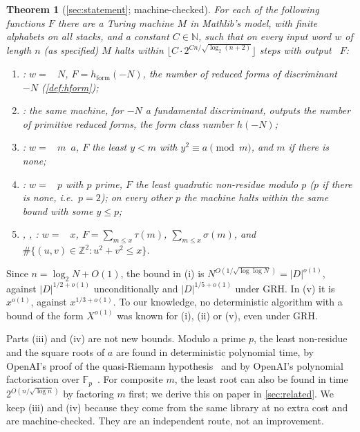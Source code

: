 \documentclass[10pt]{amsart}
\theoremstyle{plain}
\newtheorem{theorem}{Theorem}[section]
\theoremstyle{definition}
\theoremstyle{remark}
\numberwithin{equation}{section}
\newcommand{\Z}{\mathbb{Z}}
\newcommand{\N}{\mathbb{N}}
\newcommand{\hF}{h_{\mathrm{form}}}
\newcommand{\rate}{2^{O(n/\sqrt{\log n})}}
\begin{document}
\begin{theorem}[\cref{sec:statement}; machine-checked]\label{thm:main}
For each of the following functions $F$ there are a Turing machine $M$ in Mathlib's  model,
with finite alphabets on all stacks, and a constant $C\in\N$, such that on every input word $w$ of
length $n$ (as specified) $M$ halts within $\lfloor C\cdot2^{Cn/\sqrt{\log_2(n+2)}}\rfloor$ steps with
output ~$F$:
\begin{enumerate}[label=(\roman*)]
\item {}: $w=$ ~$N$, $F=\hF(-N)$, the number of reduced forms of
discriminant $-N$ (\cref{def:hform});
\item {}: the same machine, for $-N$ a fundamental discriminant, outputs the number of
primitive reduced forms, the form class number $h(-N)$;
\item {}: $w=$ ~$m$~$a$, $F$ the least $y<m$ with $y^2\equiv a\pmod m$,
and $m$ if there is none;
\item {}: $w=$ ~$p$ with $p$ prime, $F$ the least quadratic non-residue
modulo $p$ ($p$ if there is none, i.e.\ $p=2$); on every other $p$ the machine halts within the
same bound with some $y\le p$;
\item {}, , : $w=$ ~$x$,
$F=\sum_{m\le x}\tau(m)$, $\sum_{m\le x}\sigma(m)$, and $\#\{(u,v)\in\Z^2:u^2+v^2\le x\}$.
\end{enumerate}
\end{theorem}

\noindent Since $n=\log_2N+O(1)$, the bound in (i) is $N^{O(1/\sqrt{\log\log N})}=|D|^{o(1)}$, against
$|D|^{1/2+o(1)}$ unconditionally and $|D|^{1/5+o(1)}$ under GRH. In (v) it is $x^{o(1)}$, against
$x^{1/3+o(1)}$. To our knowledge, no deterministic algorithm with a bound of the form $X^{o(1)}$ was known
for (i), (ii) or (v), even under GRH.

Parts (iii) and (iv) are not new bounds. Modulo a prime $p$, the least non-residue and the square
roots of $a$ are found in deterministic polynomial time, by OpenAI's proof of the quasi-Riemann
hypothesis~\cite{OAI003} and by OpenAI's polynomial factorisation over $\mathbb{F}_p$~\cite{OAI142}. For
composite $m$, the least root can also be found in time $\rate$ by factoring $m$ first; we derive this on
paper in \cref{sec:related}. We keep (iii) and (iv) because they come from the same library at no extra
cost and are machine-checked. They are an independent route, not an improvement.
\end{document}
